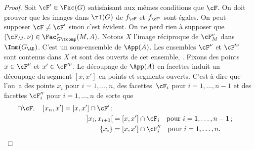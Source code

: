 \begin{proof}
Soit $\cF'\in \Fac(G)$ satisfaisant aux mêmes conditions que $\cF$. On doit prouver que les images dans $\rI(G)$ de $f_{\cF}$ et $f_{\cF'}$ sont égales. On peut supposer $\cF\neq\cF'$ sinon c'est évident. On ne perd rien à supposer que $(\cF_{M},\nu)\in \Fac^*_{G\tcomp}(M,A)$. Notons $X$ l'image réciproque de $\cF^{\nu}_{M}$ dans $\Imm(G_{\AD})$. C'est un sous-ensemble de $\App(A)$. Les ensembles $\cF^{\nu}$ et $\cF^{\prime\nu}$ sont contenus dans $X$ et sont des ouverts de cet ensemble, \cf \cite[Lem.\,7]{W2}. Fixons des points $x\in \cF^{\nu}$ et $x'\in \cF^{\prime\nu}$. Le découpage de $\App(A)$ en facettes induit un découpage du segment $[x,x']$ en points et segments ouverts. C'est-à-dire que l'on~a des points $x_{i}$ pour $i=1,\dots,n$, des facettes~$\cF_{i}$ pour $i=1,\dots,n-1$ et des facettes $\cF''_{i}$ pour $i=1,\dots,n$ de sorte que
\begin{align*}
[x,x_{1}[{}&=[x,x']\cap \cF,\quad ]x_{n},x']=[x,x']\cap \cF'\,;\\
]x_{i},x_{i+1}[{}&=[x,x']\cap \cF_{i}\quad\text{pour }i=1,\dots,n-1\,;\\
\{x_{i}\}&=[x,x']\cap \cF''_{i}\quad\text{pour }i=1,\dots,n.
\end{align*}


\end{proof}
